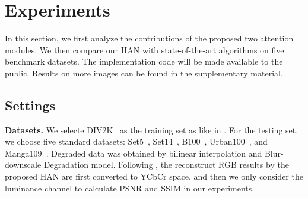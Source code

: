\documentclass[runningheads]{llncs}
\begin{document}
\begin{table}[!ht]
\begin{tabular}{|p{7em}|p{2.5em}|p{2.5em}|p{3em}|p{2.5em}|p{3em}|p{2.5em}|p{3em}|p{2.5em}|p{3em}|p{2.5em}|p{3em}|}
		\hline
	\end{tabular}\label{table-BI}\end{table}











\section{Experiments}
\label{sec-exp}
In this section, we first analyze the contributions of the proposed two attention modules. We then compare our HAN with state-of-the-art algorithms on five benchmark datasets. 
The implementation code will be made available to the public. Results on more images can be found in the supplementary material.

\subsection{Settings}
\noindent\textbf{Datasets.} We selecte DIV2K~\cite{timofte2017ntire} as the training set as like in \cite{zhang2018image,dai2019second,zhang2018residual,lim2017enhanced}.
For the testing set, we choose five standard datasets: Set5~\cite{bevilacqua2012low}, Set14~\cite{zeyde2010single}, B100~\cite{martin2001database}, Urban100~\cite{huang2015single}, and Manga109~\cite{matsui2017sketch}. Degraded data was obtained by bilinear interpolation and Blur-downscale Degradation model. 
Following \cite{zhang2018image}, the reconstruct RGB results by the proposed HAN are first converted to YCbCr space, and then we only consider the luminance channel to calculate PSNR and SSIM in our experiments.
\end{document}
